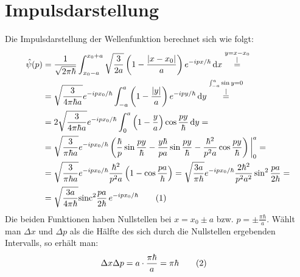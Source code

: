 \documentclass[a4paper,12pt]{article}
\newcommand\numberthis{\addtocounter{equation}{1}\tag{\theequation}}
\newcommand{\kom}{}
\newcommand{\intx}{}
\newcommand{\kla}{}
\begin{document}
\section{Impulsdarstellung}
Die Impulsdarstellung der Wellenfunktion berechnet sich wie folgt:
\begin{align*}
\hat{\psi}(p)&=\frac{1}{\sqrt{2\pi\hbar}}\intx\int_{x_0-a}^{x_0+a}\sqrt{\frac{3}{2a}}\kla\left( {1-\frac{|x-x_0|}{a}} \right)e^{-ipx/\hbar}\,\mathrm{d}x\kom\overset{\substack{{y=x-x_0} \\ |}}{=} \\
&=\sqrt{\frac{3}{4\pi\hbar a}}e^{-ipx_0/\hbar}\intx\int_{-a}^{a}\kla\left( {1-\frac{|y|}{a}} \right)e^{-ipy/\hbar}\,\mathrm{d}y\kom\overset{\substack{{\int_{-a}^a\sin y=0} \\ |}}{=} \\
&=2\sqrt{\frac{3}{4\pi\hbar a}}e^{-ipx_0/\hbar}\intx\int_{0}^{a}\kla\left( {1-\frac{y}{a}} \right)\cos\frac{py}{\hbar}\,\mathrm{d}y= \\
&=\sqrt{\frac{3}{\pi\hbar a}}e^{-ipx_0/\hbar}\kla\left( {\frac{\hbar}{p}\sin\frac{py}{\hbar}-\frac{y\hbar}{pa}\sin\frac{py}{\hbar}-\frac{\hbar^2}{p^2a}\cos\frac{py}{\hbar}} \right)\bigg\vert_0^a = \\
&=\sqrt{\frac{3}{\pi\hbar a}}e^{-ipx_0/\hbar}\frac{\hbar^2}{p^2a}\kla\left( {1-\cos\frac{pa}{\hbar}} \right)=\sqrt{\frac{3a}{\pi \hbar}}e^{-ipx_0/\hbar}\frac{2\hbar^2}{p^2a^2}\sin^2\frac{pa}{2\hbar}= \\
&=\sqrt{\frac{3a}{4\pi\hbar}}\mathrm{sinc}^2\frac{pa}{2\hbar}\,e^{-ipx_0/\hbar}\numberthis\label{Fouriertransformierte}
\end{align*}
Die beiden Funktionen haben Nullstellen bei $x=x_0\pm a$ bzw. $p=\pm\frac{\pi\hbar}{a}$. Wählt man $\Delta x$ und $\Delta p$ als die Hälfte des sich durch die Nullstellen ergebenden Intervalls, so erhält man:
\begin{align*}
\Delta x\Delta p&=a\cdot \frac{\pi\hbar}{a}=\pi\hbar \numberthis\label{Unschaerfe}
\end{align*}
\end{document}
